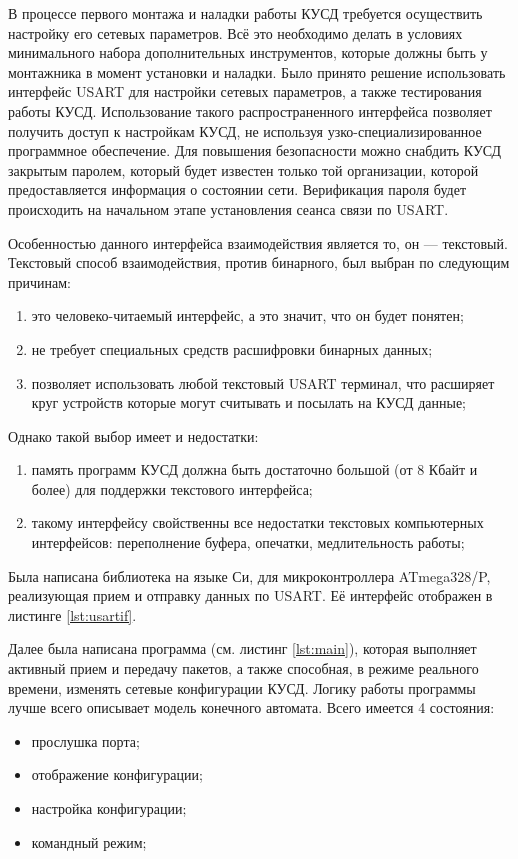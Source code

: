 В процессе первого монтажа и наладки работы КУСД требуется осуществить настройку его сетевых параметров. Всё это необходимо делать в условиях минимального набора дополнительных инструментов, которые должны быть у монтажника в момент установки и наладки. Было принято решение использовать интерфейс USART для настройки сетевых параметров, а также тестирования работы КУСД. Использование такого распространенного интерфейса позволяет получить доступ к настройкам КУСД, не используя узко-специализированное программное обеспечение. Для повышения безопасности можно снабдить КУСД закрытым паролем, который будет известен только той организации, которой предоставляется информация о состоянии сети. Верификация пароля будет происходить на начальном этапе установления сеанса связи по USART.

Особенностью данного интерфейса взаимодействия является то, он --- текстовый. Текстовый способ взаимодействия, против бинарного, был выбран по следующим причинам:
\begin{enumerate}
	\item это человеко-читаемый интерфейс, а это значит, что он будет понятен;
	\item не требует специальных средств расшифровки бинарных данных;
	\item позволяет использовать любой текстовый USART терминал, что расширяет круг устройств которые могут считывать и посылать на КУСД данные;
\end{enumerate}

Однако такой выбор имеет и недостатки:
\begin{enumerate}
	\item память программ КУСД должна быть достаточно большой (от 8 Кбайт и более) для поддержки текстового интерфейса;
	\item такому интерфейсу свойственны все недостатки текстовых компьютерных интерфейсов: переполнение буфера, опечатки, медлительность работы;
\end{enumerate}

Была написана библиотека на языке Си, для микроконтроллера ATmega328/P, реализующая прием и отправку данных по USART. Её интерфейс отображен в листинге \ref{lst:usartif}.

{\small{}}

Далее была написана программа (см. листинг \ref{lst:main}), которая выполняет активный прием и передачу пакетов, а также способная, в режиме реального времени, изменять сетевые конфигурации КУСД. Логику работы программы лучше всего описывает модель конечного автомата. Всего имеется 4 состояния:
\begin{itemize}
	\item прослушка порта;
	\item отображение конфигурации;
	\item настройка конфигурации;
	\item командный режим;
\end{itemize}

